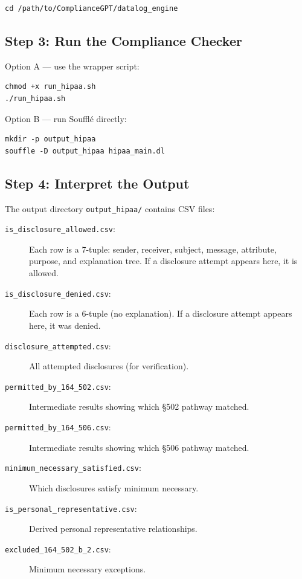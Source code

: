 \documentclass[11pt,letterpaper]{article}
\begin{document}
\begin{lstlisting}[style=bashstyle]
cd /path/to/ComplianceGPT/datalog_engine
\end{lstlisting}

\subsection{Step 3: Run the Compliance Checker}

Option A --- use the wrapper script:
\begin{lstlisting}[style=bashstyle]
chmod +x run_hipaa.sh
./run_hipaa.sh
\end{lstlisting}

Option B --- run Souffl\'{e} directly:
\begin{lstlisting}[style=bashstyle]
mkdir -p output_hipaa
souffle -D output_hipaa hipaa_main.dl
\end{lstlisting}

\subsection{Step 4: Interpret the Output}

The output directory \texttt{output\_hipaa/} contains CSV files:

\begin{description}
  \item[\texttt{is\_disclosure\_allowed.csv}:] Each row is a 7-tuple: sender, receiver, subject, message, attribute, purpose, and explanation tree. If a disclosure attempt appears here, it is allowed.
  \item[\texttt{is\_disclosure\_denied.csv}:] Each row is a 6-tuple (no explanation). If a disclosure attempt appears here, it was denied.
  \item[\texttt{disclosure\_attempted.csv}:] All attempted disclosures (for verification).
  \item[\texttt{permitted\_by\_164\_502.csv}:] Intermediate results showing which \S 502 pathway matched.
  \item[\texttt{permitted\_by\_164\_506.csv}:] Intermediate results showing which \S 506 pathway matched.
  \item[\texttt{minimum\_necessary\_satisfied.csv}:] Which disclosures satisfy minimum necessary.
  \item[\texttt{is\_personal\_representative.csv}:] Derived personal representative relationships.
  \item[\texttt{excluded\_164\_502\_b\_2.csv}:] Minimum necessary exceptions.
\end{description}
\end{document}
